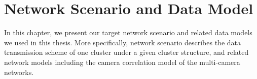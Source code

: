 \section{Network Scenario and Data Model}
\label{sec::scenarioAndModel}
In this chapter, we present our target network scenario and related data models we used in this thesis.
More specifically, network scenario describes the data transmission scheme of one cluster under a given cluster structure, and related network models including the camera correlation model of the multi-camera networks.



